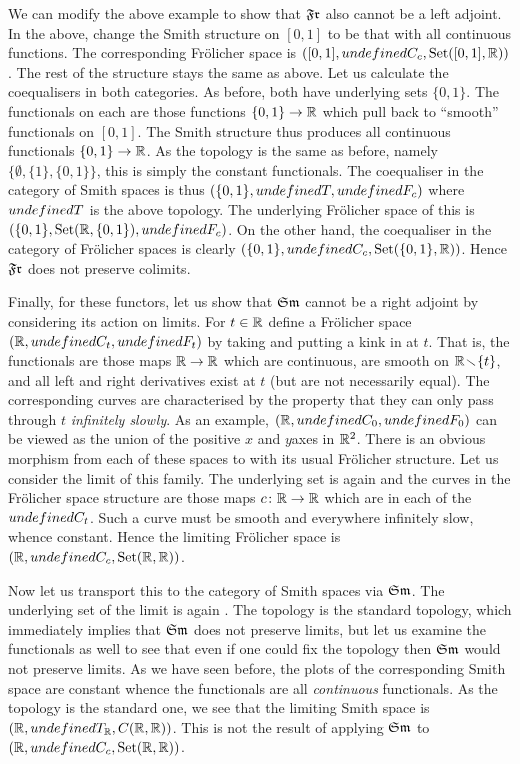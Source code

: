 \documentclass[%
a4paper,%
arxiv,%
defaults
]{myclass}
\begin{document}
We can modify the above example to show that \(\SmFr\) also cannot be a left adjoint.
In the above, change the Smith structure on \([0,1]\) to be that with all continuous functions.
The corresponding Fr\"olicher space is \(([0,1], \m{C}_c, \Set([0,1], \R))\).
The rest of the structure stays the same as above.
Let us calculate the coequalisers in both categories.
As before, both have underlying sets \(\{0,1\}\).
The functionals on each are those functions \(\{0,1\} \to \mathbb{R}\) which pull back to ``smooth'' functionals on \([0,1]\).
The Smith structure thus produces all continuous functionals \(\{0,1\} \to \mathbb{R}\).
As the topology is the same as before, namely \(\{\emptyset, \{1\}, \{0,1\}\}\), this is simply the constant functionals.
The coequaliser in the category of Smith spaces is thus \((\{0,1\}, \m{T}, \m{F}_c)\) where \(\m{T}\) is the above topology.
The underlying Fr\"olicher space of this is \((\{0,1\}, \Set(\R, \{0,1\}), \m{F}_c)\).
On the other hand, the coequaliser in the category of Fr\"olicher spaces is clearly \((\{0,1\}, \m{C}_c, \Set(\{0,1\}, \R))\).
Hence \(\SmFr\) does not preserve colimits.

\medskip

Finally, for these functors, let us show that \(\FrSm\) cannot be a right adjoint by considering its action on limits.
For \(t \in \mathbb{R}\) define a Fr\"olicher space \((\R, \m{C}_t, \m{F}_t)\) by taking \R and putting a kink in at \(t\).
That is, the functionals are those maps \(\mathbb{R} \to \mathbb{R}\) which are continuous, are smooth on \(\mathbb{R} \!\smallsetminus\! \{t\}\), and all left and right derivatives exist at \(t\) (but are not necessarily equal).
The corresponding curves are characterised by the property that they can only pass through \(t\) \emph{infinitely slowly}.
As an example, \((\R, \m{C}_0, \m{F}_0)\) can be viewed as the union of the positive \(x\)\enhyp{} and \(y\)\enhyp{}axes in \(\mathbb{R}^2\).
There is an obvious morphism from each of these spaces to \R with its usual Fr\"olicher structure.
Let us consider the limit of this family.
The underlying set is again \R and the curves in the Fr\"olicher space structure are those maps \(c \colon \mathbb{R} \to \mathbb{R}\) which are in each of the \(\m{C}_t\).
Such a curve must be smooth and everywhere infinitely slow, whence constant.
Hence the limiting Fr\"olicher space is \((\R, \m{C}_c, \Set(\R,\R))\).

Now let us transport this to the category of Smith spaces via \(\FrSm\).
The underlying set of the limit is again \R.
The topology is the standard topology, which immediately implies that \(\FrSm\) does not preserve limits, but let us examine the functionals as well to see that even if one could fix the topology then \(\FrSm\) would not preserve limits.
As we have seen before, the plots of the corresponding Smith space are constant whence the functionals are all \emph{continuous} functionals.
As the topology is the standard one, we see that the limiting Smith space is \((\R, \m{T}_\R, C(\R,\R))\).
This is not the result of applying \(\FrSm\) to \((\R, \m{C}_c, \Set(\R,\R))\).
\end{document}
